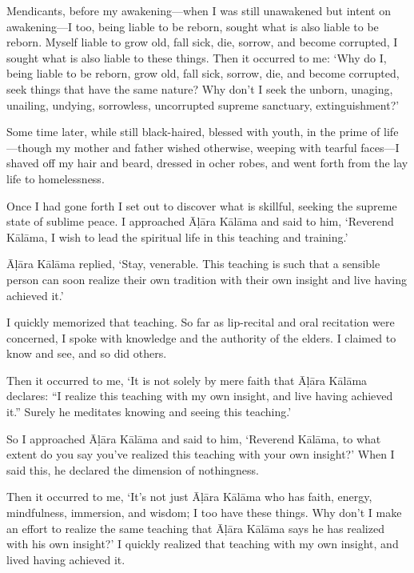 \documentclass[12pt,openany]{book}%
\begin{document}
Mendicants, before my awakening—when I was still unawakened but intent on awakening—I too, being liable to be reborn, sought what is also liable to be reborn. Myself liable to grow old, fall sick, die, sorrow, and become corrupted, I sought what is also liable to these things. Then it occurred to me: ‘Why do I, being liable to be reborn, grow old, fall sick, sorrow, die, and become corrupted, seek things that have the same nature? Why don’t I seek the unborn, unaging, unailing, undying, sorrowless, uncorrupted supreme sanctuary, extinguishment?’ 

Some time later, while still black-haired, blessed with youth, in the prime of life—though my mother and father wished otherwise, weeping with tearful faces—I shaved off my hair and beard, dressed in ocher robes, and went forth from the lay life to homelessness. 

Once I had gone forth I set out to discover what is skillful, seeking the supreme state of sublime peace. I approached \textsanskrit{Āḷāra} \textsanskrit{Kālāma} and said to him, ‘Reverend \textsanskrit{Kālāma}, I wish to lead the spiritual life in this teaching and training.’ 

\textsanskrit{Āḷāra} \textsanskrit{Kālāma} replied, ‘Stay, venerable. This teaching is such that a sensible person can soon realize their own tradition with their own insight and live having achieved it.’ 

I quickly memorized that teaching. So far as lip-recital and oral recitation were concerned, I spoke with knowledge and the authority of the elders. I claimed to know and see, and so did others. 

Then it occurred to me, ‘It is not solely by mere faith that \textsanskrit{Āḷāra} \textsanskrit{Kālāma} declares: “I realize this teaching with my own insight, and live having achieved it.” Surely he meditates knowing and seeing this teaching.’ 

So I approached \textsanskrit{Āḷāra} \textsanskrit{Kālāma} and said to him, ‘Reverend \textsanskrit{Kālāma}, to what extent do you say you’ve realized this teaching with your own insight?’ When I said this, he declared the dimension of nothingness. 

Then it occurred to me, ‘It’s not just \textsanskrit{Āḷāra} \textsanskrit{Kālāma} who has faith, energy, mindfulness, immersion, and wisdom; I too have these things. Why don’t I make an effort to realize the same teaching that \textsanskrit{Āḷāra} \textsanskrit{Kālāma} says he has realized with his own insight?’ I quickly realized that teaching with my own insight, and lived having achieved it. 
\end{document}
